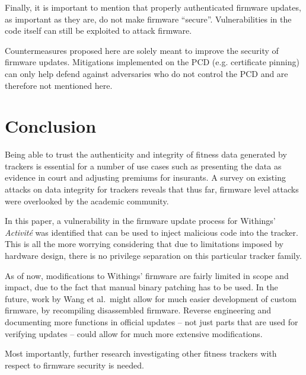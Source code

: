 \documentclass[english]{lni}
\begin{document}
Finally, it is important to mention that properly authenticated firmware updates, as important as they are, do not make firmware ``secure''. Vulnerabilities in the code itself can still be exploited to attack firmware.

Countermeasures proposed here are solely meant to improve the security of firmware updates. Mitigations implemented on the PCD (e.g. certificate pinning) can only help defend against adversaries who do not control the PCD and are therefore not mentioned here.

\section{Conclusion}
\label{conclusion}

Being able to trust the authenticity and integrity of fitness data generated by trackers is essential for a number of use cases such as presenting the data as evidence in court and adjusting premiums for insurants. A survey on existing attacks on data integrity for trackers reveals that thus far, firmware level attacks were overlooked by the academic community.

In this paper, a vulnerability in the firmware update process for Withings' \emph{Activité} was identified that can be used to inject malicious code into the tracker. This is all the more worrying considering that due to limitations imposed by hardware design, there is no privilege separation on this particular tracker family.

As of now, modifications to Withings' firmware are fairly limited in scope and impact, due to the fact that manual binary patching has to be used. In the future, work by Wang et al.~might allow for much easier development of custom firmware, by recompiling disassembled firmware. Reverse engineering and documenting more functions in official updates -- not just parts that are used for verifying updates -- could allow for much more extensive modifications.

Most importantly, further research investigating other fitness trackers with respect to firmware security is needed.



\end{document}
